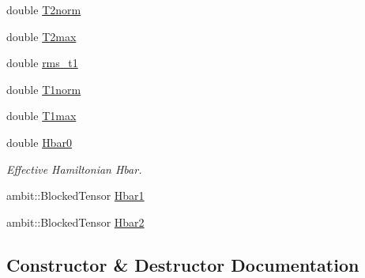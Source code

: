 \begin{DoxyCompactItemize}
\item 
double \mbox{\hyperlink{classforte_1_1_m_r_d_s_r_g___s_o_a8a2bc54fd9f62075214e717350d9fb5c}{T2norm}}
\item 
double \mbox{\hyperlink{classforte_1_1_m_r_d_s_r_g___s_o_a5b02c5c366923e60a0f93afd3f4fb176}{T2max}}
\item 
double \mbox{\hyperlink{classforte_1_1_m_r_d_s_r_g___s_o_a1ba9cc5106b67808c5b985076b6df5cc}{rms\+\_\+t1}}
\item 
double \mbox{\hyperlink{classforte_1_1_m_r_d_s_r_g___s_o_ae5e0892fd2d888306ed652ad382563eb}{T1norm}}
\item 
double \mbox{\hyperlink{classforte_1_1_m_r_d_s_r_g___s_o_a85f8d26c7abe9fa3f81d808d5a30b00f}{T1max}}
\item 
double \mbox{\hyperlink{classforte_1_1_m_r_d_s_r_g___s_o_a5ca5d8e8adab123d80b27f2734a578e9}{Hbar0}}
\begin{DoxyCompactList}\small\item\em Effective Hamiltonian Hbar. \end{DoxyCompactList}\item 
ambit\+::\+Blocked\+Tensor \mbox{\hyperlink{classforte_1_1_m_r_d_s_r_g___s_o_a9fb79a9558f8ecea3d1c4445a6fac7ba}{Hbar1}}
\item 
ambit\+::\+Blocked\+Tensor \mbox{\hyperlink{classforte_1_1_m_r_d_s_r_g___s_o_a6412e904e3aab33f1199c454e965c848}{Hbar2}}
\end{DoxyCompactItemize}


\subsection{Constructor \& Destructor Documentation}
\mbox{\label{classforte_1_1_m_r_d_s_r_g___s_o_a7423c018162ac2584b0fc4cc693d930c}} 
